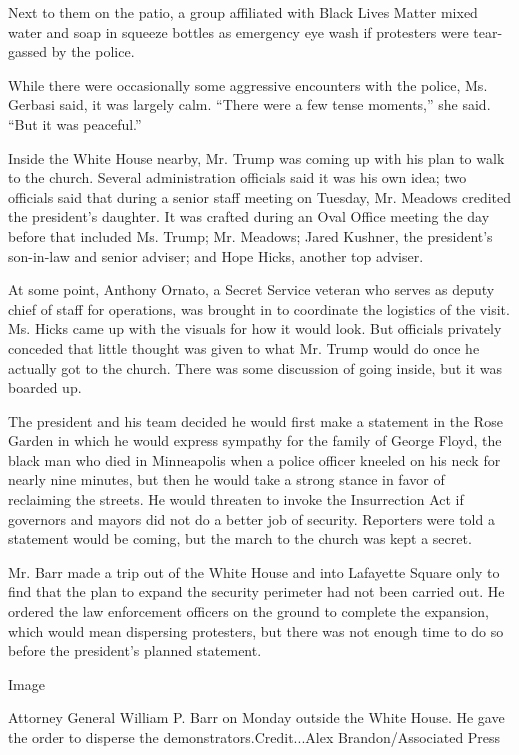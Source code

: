 Next to them on the patio, a group affiliated with Black Lives Matter
mixed water and soap in squeeze bottles as emergency eye wash if
protesters were tear-gassed by the police.

While there were occasionally some aggressive encounters with the
police, Ms. Gerbasi said, it was largely calm. ``There were a few tense
moments,'' she said. ``But it was peaceful.''

Inside the White House nearby, Mr. Trump was coming up with his plan to
walk to the church. Several administration officials said it was his own
idea; two officials said that during a senior staff meeting on Tuesday,
Mr. Meadows credited the president's daughter. It was crafted during an
Oval Office meeting the day before that included Ms. Trump; Mr. Meadows;
Jared Kushner, the president's son-in-law and senior adviser; and Hope
Hicks, another top adviser.

At some point, Anthony Ornato, a Secret Service veteran who serves as
deputy chief of staff for operations, was brought in to coordinate the
logistics of the visit. Ms. Hicks came up with the visuals for how it
would look. But officials privately conceded that little thought was
given to what Mr. Trump would do once he actually got to the church.
There was some discussion of going inside, but it was boarded up.

The president and his team decided he would first make a statement in
the Rose Garden in which he would express sympathy for the family of
George Floyd, the black man who died in Minneapolis when a police
officer kneeled on his neck for nearly nine minutes, but then he would
take a strong stance in favor of reclaiming the streets. He would
threaten to invoke the Insurrection Act if governors and mayors did not
do a better job of security. Reporters were told a statement would be
coming, but the march to the church was kept a secret.

Mr. Barr made a trip out of the White House and into Lafayette Square
only to find that the plan to expand the security perimeter had not been
carried out. He ordered the law enforcement officers on the ground to
complete the expansion, which would mean dispersing protesters, but
there was not enough time to do so before the president's planned
statement.

Image

Attorney General William P. Barr on Monday outside the White House. He
gave the order to disperse the demonstrators.Credit...Alex
Brandon/Associated Press

